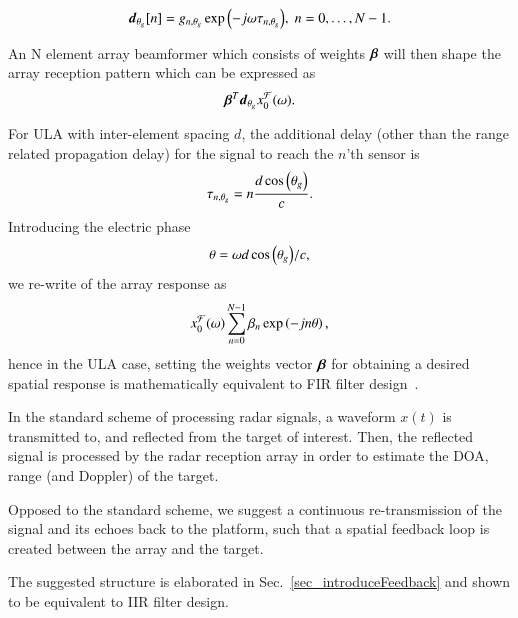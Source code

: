 \begin{equation}
    \label{eq:d}
    \vd_{\theta_g}[n] = g_{n,\theta_{g}}\exp{\rBrace{-j\omega\tau_{n,\theta_g}}},\;n=0,\ldots,N-1.
\end{equation}
\par An N element array beamformer which consists of weights $\boldsymbol{\beta}$ will then shape the array reception pattern which can be expressed as 
$$ \boldsymbol{\beta}^{T}\boldsymbol{d}_{\theta_g}x^\mathcal{F}_0(\omega). $$ 
\par For ULA with inter-element spacing $d$, the additional delay (other than the range related propagation delay) for the signal to reach the $n$'th sensor is
$$
\tau_{n,\theta_g}=n\frac{d\cos\left({\theta_{g}}\right)}{c}.
$$
Introducing the electric phase
\begin{equation}\label{eq:thetaULA}
\theta=\omega{d\cos\Brack{\theta_{g}}}/{c},
\end{equation}
we re-write of the array response as 
\[
x^\mathcal{F}_0(\omega)\sum_{n=0}^{N-1}\beta_n
\exp\left({-jn\theta}\right),
\]
hence in the ULA case, setting the weights vector $\boldsymbol{\beta}$ for obtaining a desired spatial response is mathematically equivalent to FIR filter design~\cite{VanVeenBeamforming:Filtering}.
\par In the standard scheme of processing radar signals, a waveform $x(t)$ is transmitted to, and reflected from the target of interest. Then, the reflected signal is processed by the radar reception array in order to estimate the DOA, range (and Doppler) of the target. 
\par Opposed to the standard scheme, we suggest a continuous re-transmission of the signal and its echoes back to the platform, such that a spatial feedback loop is created between the array and the target. 
\par The suggested structure is elaborated in Sec.~\ref{sec_introduceFeedback} and shown to be equivalent to IIR filter design.